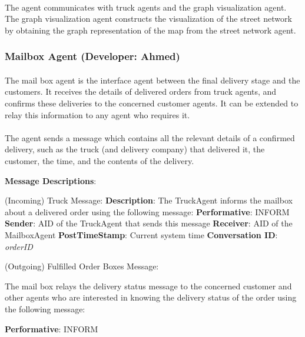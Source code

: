 \documentclass[11pt, a4paper]{article}
\begin{document}
\paragraph{}
The agent communicates with truck agents and the graph visualization agent. The graph visualization agent constructs the visualization of the street network by obtaining the graph representation of the map from the street network agent.
\subsubsection{Mailbox Agent (Developer: Ahmed)}
\paragraph{}
The mail box agent is the interface agent between the final delivery stage and the customers. It receives the details of delivered orders from truck agents, and confirms these deliveries to the concerned customer agents. It can be extended to relay this information to any agent who requires it.
\paragraph{}
The agent sends a message which contains all the relevant details of a confirmed delivery, such as the truck (and delivery company) that delivered it, the customer, the time, and the contents of the delivery.

\hfill\break
\textbf{Message Descriptions}:

\hfill\break
(Incoming) Truck Message:
\hfill\break
\textbf{Description}:
The TruckAgent informs the mailbox about a delivered order using the following message:
\hfill\break
\textbf{Performative}: INFORM
\hfill\break
\textbf{Sender}: AID of the TruckAgent that sends this message
\hfill\break
\textbf{Receiver}: AID of the MailboxAgent
\hfill\break
\textbf{PostTimeStamp}: Current system time
\hfill\break
\textbf{Conversation ID}: \textit{orderID}

\hfill\break
	
(Outgoing) Fulfilled Order Boxes Message:
	
The mail box relays the delivery status message to the concerned customer and other agents who are interested in knowing the delivery status of the order using the following message:
	
\textbf{Performative}: INFORM
	
\end{document}
